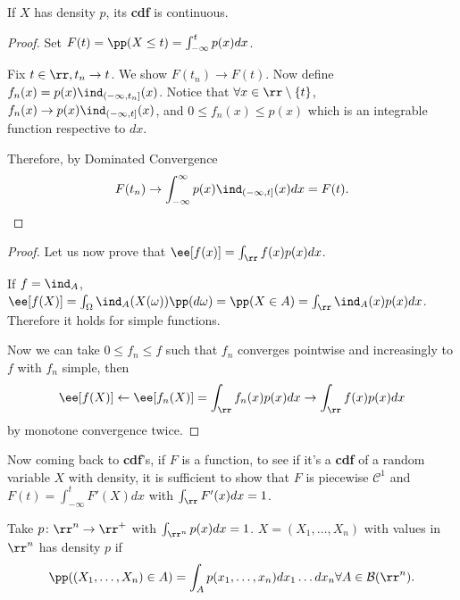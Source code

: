 \documentclass[../main.tex]{subfiles}
\begin{document}
\begin{proposition}
  If $X$ has density $p$, its \textbf{cdf} is continuous. 
\end{proposition}
\begin{proof}
  Set $F(t) = \pp(X \leq t) = \int_{-\infty}^t p(x)dx$. 
  \vspace{0.3em}

  Fix $t \in \rr, t_n \to t$. We show $F(t_n) \to F(t)$. Now define $f_n(x) = p(x) 
  \ind_{(-\infty,t_n]}(x)$. Notice that $\forall x \in \rr \setminus \{t\}$, 
  $f_n(x) \to p(x) \ind_{(-\infty, t]}(x)$, and $0 \leq f_n(x) \leq p(x)$ which is 
  an integrable function respective to $dx$.

  \vspace{0.3em}

  Therefore, by Dominated Convergence
  \[
    F(t_n) \to \int_{-\infty}^\infty p(x) \ind_{(-\infty, t]}(x)dx = F(t)
  .\] 
\end{proof}

\begin{proof}
Let us now prove that $\ee[f(x)] = \int_{\rr} f(x)p(x)dx$.
\vspace{0.3em}

If $f = \ind_{A}$, $\ee[f(X)] = \int_{\Omega}\ind_{A}(X(\omega))\pp(d\omega) = 
\pp(X \in A) = \int_{\rr} \ind_{A}(x)p(x)dx$. Therefore it holds for
simple functions. 

\vspace{0.3em}

Now we can take $0 \leq f_n \leq f$ such that $f_n$ converges
pointwise and increasingly to $f$ with $f_n$ simple, then 
\[
  \ee[f(X)] \gets \ee[f_n(X)] = \int_{\rr} f_n(x)p(x)dx \to
  \int_{\rr}f(x)p(x)dx
\]
by monotone convergence twice.
\end{proof}

Now coming back to \textbf{cdf}'s, if $F$ is a function, to see if it's a
\textbf{cdf} of a random variable $X$ with density, it is sufficient
to show that $F$ is piecewise $\mathcal{C}^1$ and $F(t) =
\int_{-\infty}^t F'(X)dx$ with $\int_{\rr}F'(x)dx = 1$.

\begin{definition}
  [Density in $\rr^n$] Take $p \colon \rr^n \to \rr^+$ with
  $\int_{\rr^n}p(x)dx = 1$. $X = (X_1, \ldots, X_n)$ with values in
  $\rr^n$ has density $p$ if
  \[
    \pp((X_1, \ldots, X_n) \in A) = \int_{A} p(x_1,\ldots,
    x_n)dx_1 \ldots dx_n \forall A \in \mathcal{B}(\rr^n)
  .\]
\end{definition}
\end{document}
